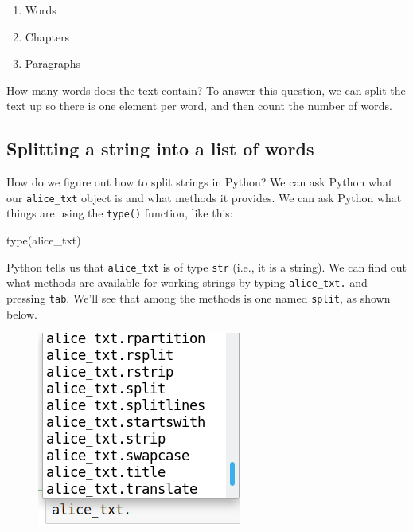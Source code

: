 \documentclass[]{book}
\newenvironment{Shaded}{\begin{snugshade}}{\end{snugshade}}
\newcommand{\BuiltInTok}[1]{#1}
\newcommand{\NormalTok}[1]{#1}
\providecommand{\tightlist}{%
  \setlength{\itemsep}{0pt}\setlength{\parskip}{0pt}}
\begin{document}
\begin{enumerate}
\def\labelenumi{\arabic{enumi}.}
\tightlist
\item
  Words
\item
  Chapters
\item
  Paragraphs
\end{enumerate}

How many words does the text contain? To answer this question, we can
split the text up so there is one element per word, and then count the
number of words.

\subsection{Splitting a string into a list of
words}\label{splitting-a-string-into-a-list-of-words}

How do we figure out how to split strings in Python? We can ask Python
what our \texttt{alice\_txt} object is and what methods it provides. We
can ask Python what things are using the \texttt{type()} function, like
this:

\begin{Shaded}
\begin{Highlighting}[]
\BuiltInTok{type}\NormalTok{(alice_txt)}
\end{Highlighting}
\end{Shaded}

Python tells us that \texttt{alice\_txt} is of type \texttt{str} (i.e.,
it is a string). We can find out what methods are available for working
strings by typing \texttt{alice\_txt.} and pressing \texttt{tab}. We'll
see that among the methods is one named \texttt{split}, as shown below.

\begin{figure}
\centering
\includegraphics{Python/PythonIntro/images/notebook_string_completion.png}
\caption{}
\end{figure}
\end{document}
